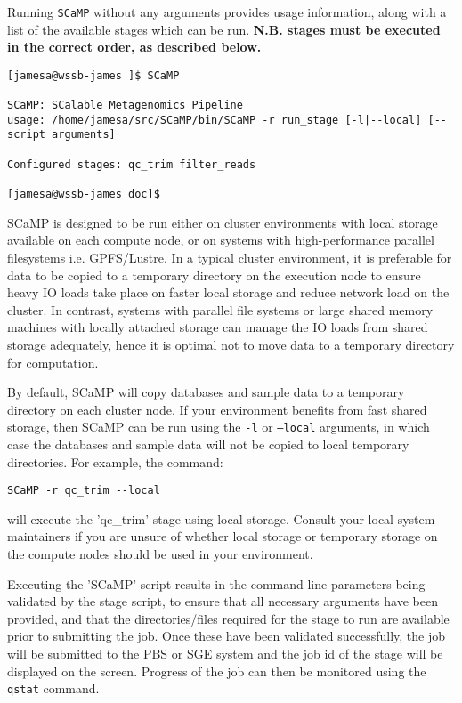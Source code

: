 \documentclass[a4paper,10pt]{article}
\begin{document}
Running {\tt SCaMP} without any arguments provides usage information, along
with a list of the available stages which can be run. \textbf{N.B. stages must
be executed in the correct order, as described below.}

\begin{verbatim}
[jamesa@wssb-james ]$ SCaMP 

SCaMP: SCalable Metagenomics Pipeline
usage: /home/jamesa/src/SCaMP/bin/SCaMP -r run_stage [-l|--local] [-- script arguments]

Configured stages: qc_trim filter_reads

[jamesa@wssb-james doc]$ 
\end{verbatim}

SCaMP is designed to be run either on cluster environments with local storage
available on each compute node, or on systems with high-performance parallel
filesystems i.e. GPFS/Lustre. In a typical cluster environment, it is
preferable for data to be copied to a temporary directory on the execution node
to ensure heavy IO loads take place on faster local storage and reduce network
load on the cluster. In contrast, systems with parallel file systems or large
shared memory machines with locally attached storage can manage the IO loads
from shared storage adequately, hence it is optimal not to move data to a
temporary directory for computation.

By default, SCaMP will copy databases and sample data to a temporary directory
on each cluster node. If your environment benefits from fast shared storage,
then SCaMP can be run using the {\tt -l} or {\tt --local} arguments, in which
case the databases and sample data will not be copied to local temporary
directories. For example, the command:

\begin{verbatim}
SCaMP -r qc_trim --local
\end{verbatim}

will execute the 'qc\_trim' stage using local storage. Consult your local
system maintainers if you are unsure of whether local storage or temporary
storage on the compute nodes should be used in your environment. 

Executing the 'SCaMP' script results in the command-line parameters being
validated by the stage script, to ensure that all necessary arguments have been
provided, and that the directories/files required for the stage to run are
available prior to submitting the job. Once these have been validated
successfully, the  job will be submitted to the PBS or SGE system and the job
id of the stage will be displayed on the screen. Progress of the job can then
be monitored using the {\tt qstat} command. 
\end{document}
